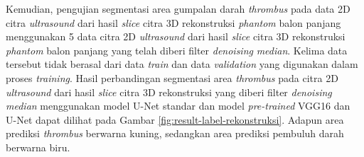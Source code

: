 Kemudian, pengujian segmentasi area gumpalan darah \textit{thrombus} pada data 2D citra \textit{ultrasound} dari hasil \textit{slice} citra 3D rekonstruksi \textit{phantom} balon panjang menggunakan 5 data citra 2D \textit{ultrasound} dari hasil \textit{slice} citra 3D rekonstruksi \textit{phantom} balon panjang yang telah diberi filter \textit{denoising} \textit{median}. Kelima data tersebut tidak berasal dari data \textit{train} dan data \textit{validation} yang digunakan dalam proses \textit{training}. Hasil perbandingan segmentasi area \textit{thrombus} pada citra 2D \textit{ultrasound} dari hasil \textit{slice} citra 3D rekonstruksi yang diberi filter \textit{denoising median}  menggunakan model U-Net standar dan model \textit{pre-trained} VGG16 dan U-Net  dapat dilihat pada Gambar \ref{fig:result-label-rekonstruksi}. Adapun area prediksi \textit{thrombus} berwarna kuning, sedangkan area prediksi pembuluh darah berwarna biru.


